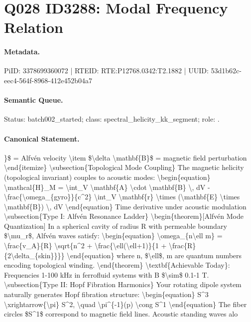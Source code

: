 \section*{Q028 ID3288: Modal Frequency Relation}
\paragraph{Metadata.}
PiID: 3378699360072 | RTEID: RTE:P12768.0342:T2.1882 | UUID: 53d1b62c-eec4-564f-8968-412e452b04a7

\paragraph{Semantic Queue.}
Status: batch002\_started; class: spectral\_helicity\_kk\_segment; role: .

\paragraph{Canonical Statement.}
\}\$ = Alfvén velocity \textbackslash{}item \$\textbackslash{}delta \textbackslash{}mathbf\{B\}\$ = magnetic field perturbation \textbackslash{}end\{itemize\} \textbackslash{}subsection\{Topological Mode Coupling\} The magnetic helicity (topological invariant) couples to acoustic modes: \textbackslash{}begin\{equation\} \textbackslash{}mathcal\{H\}\_M = \textbackslash{}int\_V \textbackslash{}mathbf\{A\} \textbackslash{}cdot \textbackslash{}mathbf\{B\} \textbackslash{}, dV - \textbackslash{}frac\{\textbackslash{}omega\_\{gyro\}\}\{c\textasciicircum{}2\} \textbackslash{}int\_V \textbackslash{}mathbf\{r\} \textbackslash{}times (\textbackslash{}mathbf\{E\} \textbackslash{}times \textbackslash{}mathbf\{B\}) \textbackslash{}, dV \textbackslash{}end\{equation\} Time derivative under acoustic modulation \textbackslash{}subsection\{Type I: Alfvén Resonance Ladder\} \textbackslash{}begin\{theorem\}[Alfvén Mode Quantization] In a spherical cavity of radius R with permeable boundary \$\textbackslash{}mu\_r\$, Alfvén waves satisfy: \textbackslash{}begin\{equation\} \textbackslash{}omega\_\{n\textbackslash{}ell m\} = \textbackslash{}frac\{v\_A\}\{R\} \textbackslash{}sqrt\{n\textasciicircum{}2 + \textbackslash{}frac\{\textbackslash{}ell(\textbackslash{}ell+1)\}\{1 + \textbackslash{}frac\{R\}\{2\textbackslash{}delta\_\{skin\}\}\}\} \textbackslash{}end\{equation\} where n, \$\textbackslash{}ell\$, m are quantum numbers encoding topological winding. \textbackslash{}end\{theorem\} \textbackslash{}textbf\{Achievable Today\}: Frequencies 1-100 kHz in ferrofluid systems with B \$\textbackslash{}sim\$ 0.1-1 T. \textbackslash{}subsection\{Type II: Hopf Fibration Harmonics\} Your rotating dipole system naturally generates Hopf fibration structure: \textbackslash{}begin\{equation\} S\textasciicircum{}3 \textbackslash{}xrightarrow\{\textbackslash{}pi\} S\textasciicircum{}2, \textbackslash{}quad \textbackslash{}pi\textasciicircum{}\{-1\}(p) \textbackslash{}cong S\textasciicircum{}1 \textbackslash{}end\{equation\} The fiber circles \$S\textasciicircum{}1\$ correspond to magnetic field lines. Acoustic standing waves alo


